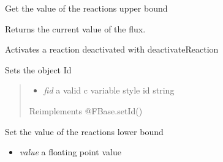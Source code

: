 \documentclass[a4paper,11pt,english]{sphinxmanual}
\begin{document}
\begin{fulllineitems}
\begin{fulllineitems}
\end{fulllineitems}


\begin{fulllineitems}
\label{modules_doc:cbmpy.CBModel.Reaction.getUpperBound}
Get the value of the reactions upper bound

\end{fulllineitems}


\begin{fulllineitems}
\label{modules_doc:cbmpy.CBModel.Reaction.getValue}
Returns the current value of the flux.

\end{fulllineitems}


\begin{fulllineitems}
\label{modules_doc:cbmpy.CBModel.Reaction.reactivateReaction}
Activates a reaction deactivated with deactivateReaction

\end{fulllineitems}


\begin{fulllineitems}
\label{modules_doc:cbmpy.CBModel.Reaction.setId}
Sets the object Id
\begin{quote}
\begin{itemize}
\item {} 
\emph{fid} a valid c variable style id string

\end{itemize}

Reimplements @FBase.setId()
\end{quote}

\end{fulllineitems}


\begin{fulllineitems}
\label{modules_doc:cbmpy.CBModel.Reaction.setLowerBound}
Set the value of the reactions lower bound
\begin{itemize}
\item {} 
\emph{value} a floating point value


\end{itemize}
\end{fulllineitems}
\end{fulllineitems}
\end{document}
